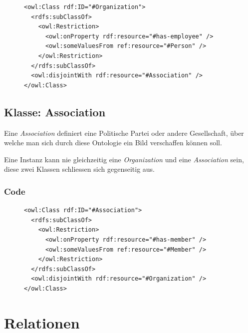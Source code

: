\documentclass[
    11pt,
    latin1,
    a4paper,
    oneside
]{scrreprt}
\begin{document}
\begin{figure}[H]
 \lstset{language=XML}
 \begin{lstlisting}[label=owl:organization,caption={Die Klasse \emph{Organization} definiert einen Arbeitgeben, meistens ein Medienhaus}]
<owl:Class rdf:ID="#Organization">
  <rdfs:subClassOf>
    <owl:Restriction>
      <owl:onProperty rdf:resource="#has-employee" />
      <owl:someValuesFrom ref:resource="#Person" />
    </owl:Restriction>
  </rdfs:subClassOf>
  <owl:disjointWith rdf:resource="#Association" />
</owl:Class>
 \end{lstlisting}
\end{figure}


\subsection{Klasse: Association} \label{sec:class_association}

Eine \emph{Association} definiert eine Politische Partei oder andere Gesellschaft, \"uber welche man sich durch diese Ontologie ein Bild verschaffen k\"onnen soll.

Eine Instanz kann nie gleichzeitig eine \emph{Organization} und eine \emph{Association} sein, diese zwei Klassen schliessen sich gegenseitig aus.

\subsubsection{Code} \label{sec:class_association_code}

\begin{figure}[H]
 \lstset{language=XML}
 \begin{lstlisting}[label=owl:association,caption={Eine \emph{Association} ist eine politische Partei oder eine andere Gesellschaft}]
<owl:Class rdf:ID="#Association">
  <rdfs:subClassOf>
    <owl:Restriction>
      <owl:onProperty rdf:resource="#has-member" />
      <owl:someValuesFrom ref:resource="#Member" />
    </owl:Restriction>
  </rdfs:subClassOf>
  <owl:disjointWith rdf:resource="#Organization" />
</owl:Class>
 \end{lstlisting}
\end{figure}



\section{Relationen} \label{sec:reltations}
\end{document}
